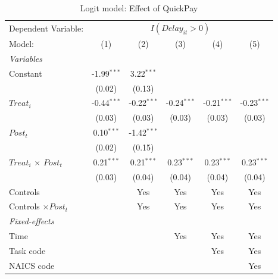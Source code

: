 \documentclass[
]{article}
\begin{document}
\begin{table}[htbp]
   \caption{Logit model: Effect of QuickPay}
   \centering
   \begin{tabular}{lccccc}
      \tabularnewline \midrule \midrule
      Dependent Variable: & \multicolumn{5}{c}{$I(Delay_{it}>0)$}\\
      Model:                       & (1)           & (2)           & (3)           & (4)           & (5)\\  
      \midrule
      \emph{Variables}\\
      Constant                     & -1.99$^{***}$ & 3.22$^{***}$  &               &               &   \\   
                                   & (0.02)        & (0.13)        &               &               &   \\   
      $Treat_i$                    & -0.44$^{***}$ & -0.22$^{***}$ & -0.24$^{***}$ & -0.21$^{***}$ & -0.23$^{***}$\\   
                                   & (0.03)        & (0.03)        & (0.03)        & (0.03)        & (0.03)\\   
      $Post_t$                     & 0.10$^{***}$  & -1.42$^{***}$ &               &               &   \\   
                                   & (0.02)        & (0.15)        &               &               &   \\   
      $Treat_i$ $\times$ $Post_t$  & 0.21$^{***}$  & 0.21$^{***}$  & 0.23$^{***}$  & 0.23$^{***}$  & 0.23$^{***}$\\   
                                   & (0.03)        & (0.04)        & (0.04)        & (0.04)        & (0.04)\\   
      Controls                     &               & Yes           & Yes           & Yes           & Yes\\  
      Controls $\times Post_t$     &               & Yes           & Yes           & Yes           & Yes\\  
      \midrule
      \emph{Fixed-effects}\\
      Time                         &               &               & Yes           & Yes           & Yes\\  
      Task code                    &               &               &               & Yes           & Yes\\  
      NAICS code                   &               &               &               &               & Yes\\  

\end{tabular}
\end{table}
\end{document}
